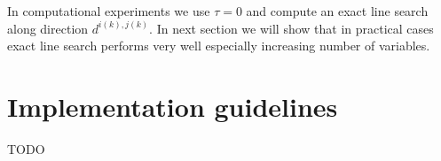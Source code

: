 \begin{oss}
In computational experiments we use $\tau = 0$ and compute an exact line search along direction $d^{i(k),j(k)}$. In next section we will show that in practical cases exact line search performs very well especially increasing number of variables.
\end{oss}

\section{Implementation guidelines}
TODO